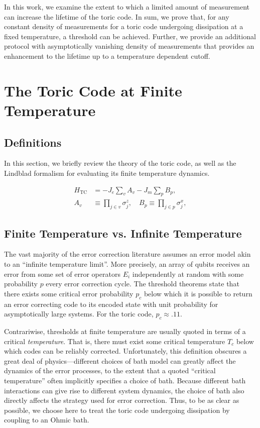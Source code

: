 \documentclass[twocolumn,superscriptaddress,aps,prb,floatfix]{revtex4-1}
\newcommand{\Htc}{H_{\mathrm{TC}}}
\begin{document}
 In this work, we examine the extent to which a limited amount of measurement can increase the lifetime of the toric code.  In sum, we prove that, for any constant density of measurements for a toric code undergoing dissipation at a fixed temperature, a threshold can be achieved.  Further, we provide an additional protocol with asymptotically vanishing density of measurements that provides an enhancement to the lifetime up to a temperature dependent cutoff.
	
\section{The Toric Code at Finite Temperature}
\label{sec:TORIC}

\subsection{Definitions}
\label{sec:Defs}
In this section, we briefly review the theory of the toric code, as well as the Lindblad formalism for evaluating its finite temperature dynamics.

\begin{align}
\Htc &= -J_e \sum_v A_v -J_m \sum_p B_p ,\label{eq:HTC}\\
A_v &\equiv \prod_{j \in v} \sigma_j^z,\quad B_p \equiv \prod_{j \in p} \sigma_j^x,\label{eq:AvBp}
\end{align}

\subsection{Finite Temperature vs. Infinite Temperature}
\label{sec:temperature}

 The vast majority of the error correction literature assumes an error model akin to an ``infinite temperature limit''.  More precisely, an array of qubits receives an error from some set of error operators ${E_i}$ independently at random with some probability $p$ every error correction cycle.  The threshold theorems state that there exists some critical error probability $p_c$ below which it is possible to return an error correcting code to its encoded state with unit probability for asymptotically large systems.  For the toric code, $p_c\approx.11$.
 
 Contrariwise, thresholds at finite temperature are usually quoted in terms of a critical \emph{temperature}.  That is, there must exist some critical temperature $T_c$ below which codes can be reliably corrected.  Unfortunately, this definition obscures a great deal of physics---different choices of bath model can greatly affect the dynamics of the error processes, to the extent that a quoted ``critical temperature'' often implicitly specifies a choice of bath.  Because different bath interactions can give rise to different system dynamics, the choice of bath also directly affects the strategy used for error correction.  Thus, to be as clear as possible, we choose here to treat the toric code undergoing dissipation by coupling to an Ohmic bath.
\end{document}
